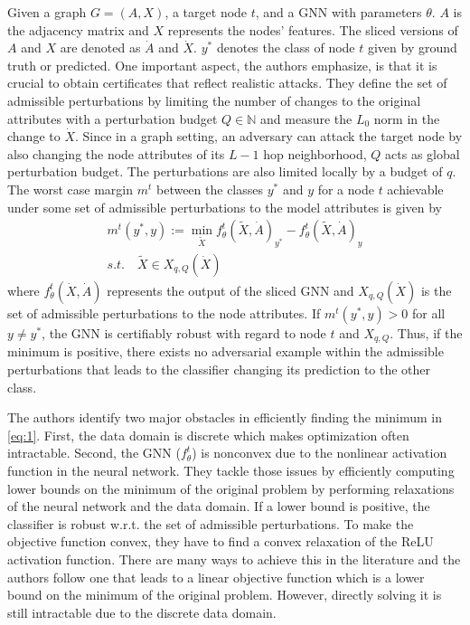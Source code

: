 \documentclass[a4paper,preprint]{sig-alternate}
\begin{document}
Given a graph $G = (A, X)$, a target node $t$, and a GNN with parameters $\theta$. $A$ is the adjacency matrix and $X$ represents the nodes' features.
The sliced versions of $A$ and $X$ are denoted as $\dot{A}$ and $\dot{X}$. $y^*$ denotes the class of node $t$ given by ground truth or predicted.
One important aspect, the authors emphasize, is that it is crucial to obtain certificates that reflect realistic attacks.
They define the set of admissible perturbations by limiting the number of changes to the original attributes with a perturbation
budget $Q \in \mathbb{N}$ and measure the $L_0$ norm in the change to $\dot{X}$. Since in a graph setting, an adversary can attack the target node
by also changing the node attributes of its $L-1$ hop neighborhood, $Q$ acts as global perturbation budget. The perturbations are also limited locally
by a budget of $q$. The worst case margin $m^t$ between the classes $y^*$ and $y$ for a node $t$ achievable under some set
of admissible perturbations to the model attributes is given by
\begin{gather} 
\label{eq:1}
    m^t (y^*, y) := \min_{\tilde{X}} f_{\theta}^t(\tilde{X}, \dot{A})_{y^*} - f_{\theta}^t(\tilde{X}, \dot{A})_y \\
    s.t. \quad \tilde{X} \in X_{q, Q} (\dot{X})
\end{gather}
where $f_{\theta}^t(\dot{X}, \dot{A})$ represents the output of the sliced GNN and $X_{q, Q} (\dot{X})$ is the set
of admissible perturbations to the node attributes.
If $m^t (y^*, y) > 0$ for all $y \neq y^*$, the GNN is certifiably robust with regard to node $t$ and $X_{q, Q}$. 
Thus, if the minimum is positive, there exists no adversarial example within the admissible perturbations that leads 
to the classifier changing its prediction to the other class.\newline

The authors identify two major obstacles in efficiently finding the minimum in \ref{eq:1}.
First, the data domain is discrete which makes optimization often intractable. Second, the GNN ($f_{\theta}^t$) is nonconvex
due to the nonlinear activation function in the neural network. They tackle those issues by efficiently computing lower bounds
on the minimum of the original problem by performing relaxations of the neural network and the data domain.
If a lower bound is positive, the classifier is robust w.r.t. the set of admissible perturbations.
To make the objective function convex, they have to find a convex relaxation of the ReLU activation function. There are many ways to achieve this
in the literature and the authors follow one that leads to a linear objective function which is a lower bound on the minimum of the original problem.
However, directly solving it is still intractable due to the discrete data domain.
\end{document}
